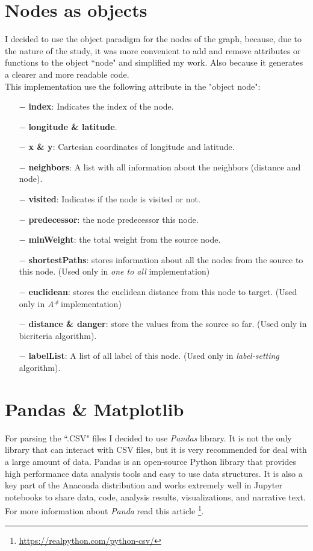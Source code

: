 \documentclass[a4paper,11pt]{report}
\begin{document}
\section{Nodes as objects}
I decided to use the object paradigm for the nodes of the graph, because, due to the nature of the study, it was more convenient to add and remove attributes or functions to the object ``node" and simplified my work. Also because it generates a clearer and more readable code.\\
This implementation use the following attribute in the "object node":
\begin{itemize}
	\item[$-$] \textbf{index}: Indicates the index of the node.
	\item[$-$] \textbf{longitude \& latitude}.
	\item[$-$] \textbf{x \& y}: Cartesian coordinates of longitude and latitude.
	\item[$-$] \textbf{neighbors}: A list with all information about the neighbors (distance and node).
	\item[$-$] \textbf{visited}: Indicates if the node is visited or not.
	\item[$-$] \textbf{predecessor}: the node predecessor this node.
	\item[$-$] \textbf{minWeight}: the total weight from the source node.
	\item[$-$] \textbf{shortestPaths}: stores information about all the nodes from the source to this node. (Used only in \textit{one to all} implementation)
	\item[$-$] \textbf{euclidean}: stores the euclidean distance from this node to target. (Used only in \textit{A*} implementation)
	\item[$-$] \textbf{distance \& danger}: store the values from the source so far. (Used only in bicriteria algorithm).
	\item[$-$] \textbf{labelList}: A list of all label of this node. (Used only in \textit{label-setting} algorithm).
\end{itemize}
\section{Pandas \& Matplotlib}
For parsing the ``.CSV" files I decided to use \textit{Pandas} library. It is not the only library that can interact with CSV files, but it is very recommended for deal with a large amount of data.
Pandas is an open-source Python library that provides high performance data analysis tools and easy to use data structures. It is also a key part of the Anaconda distribution and works extremely well in Jupyter notebooks to share data, code, analysis results, visualizations, and narrative text. For more information about \textit{Panda} read this article \footnote{\url{https://realpython.com/python-csv/}}.
\vspace{5mm}
\end{document}
